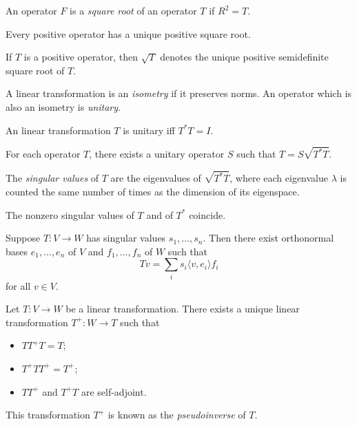 \begin{defn}
  An operator $F$ is a \emph{square root} of an operator $T$ if $R^2=T$.
\end{defn}
\begin{prop}
  Every positive operator has a unique positive square root.
\end{prop}
\begin{defn}
  If $T$ is a positive operator, then $\sqrt T$ denotes the unique positive
  semidefinite square root of $T$.
\end{defn}
\begin{defn}
  A linear transformation is an \emph{isometry} if it preserves norms. An
  operator which is also an isometry is \emph{unitary}.
\end{defn}
\begin{prop}
  An linear transformation $T$ is unitary iff $T^*T=I$.
\end{prop}
\begin{thm}
  For each operator $T$, there exists a unitary operator $S$ such that
  $T=S\sqrt{T^*T}$.
\end{thm}
\begin{defn}
  The \emph{singular values} of $T$ are the eigenvalues of $\sqrt{T^*T}$,
  where each eigenvalue $\lambda$ is counted the same number of times as the
  dimension of its eigenspace.
\end{defn}
\begin{prop}
  The nonzero singular values of $T$ and of $T^*$ coincide.
\end{prop}
\begin{thm}
  Suppose $T:V\to W$ has singular values $s_1,\ldots,s_n$. Then there exist
  orthonormal bases $e_1,\ldots,e_n$ of $V$ and $f_1,\ldots,f_n$ of $W$ such that
  \[Tv=\sum_i s_i\langle v,e_i\rangle f_i\]
  for all $v\in V$.
\end{thm}
\begin{prop}
  Let $T:V\to W$ be a linear transformation. There exists a unique linear
  transformation $T^+:W\to T$ such that
  \begin{itemize}
    \item $TT^+T=T$;
    \item $T^+TT^+=T^+$;
    \item $TT^+$ and $T^+T$ are self-adjoint.
  \end{itemize}
\end{prop}
\begin{defn}
  This transformation $T^+$ is known as the \emph{pseudoinverse} of $T$.
\end{defn}
